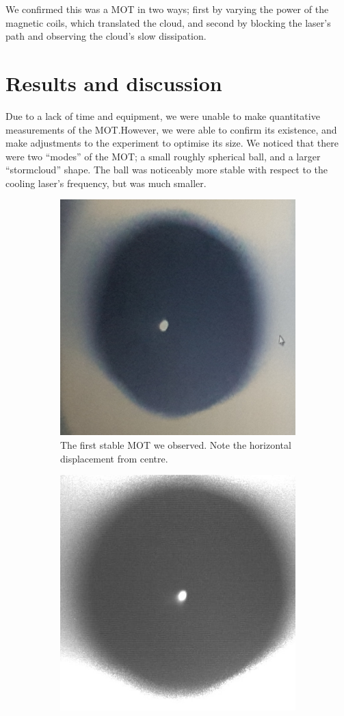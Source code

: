 \documentclass[11pt,twoside,a4paper]{article}
\begin{document}
We confirmed this was a MOT in two ways; first by varying the power of the magnetic coils, which translated the cloud, and second by blocking the laser's path
and observing the cloud's slow dissipation.
\section{Results and discussion}
Due to a lack of time and equipment, we were unable to make quantitative measurements of the MOT.\@ However, we were able to confirm its existence, and make adjustments
to the experiment to optimise its size. We noticed that there were two ``modes'' of the MOT; a small roughly spherical ball, and a larger ``stormcloud'' shape. The ball
was noticeably more stable with respect to the cooling laser's frequency, but was much smaller.
\begin{figure}[h]
    \centering
    \begin{subfigure}{.3\textwidth}
        \centering
        \includegraphics[width=.7\textwidth]{images/success1}
        \caption{The first stable MOT we observed. Note the horizontal displacement from centre.}
    \end{subfigure}
    \begin{subfigure}{.3\textwidth}
        \centering
        \includegraphics[width=.7\textwidth]{images/success2}

\end{subfigure}
\end{figure}
\end{document}

